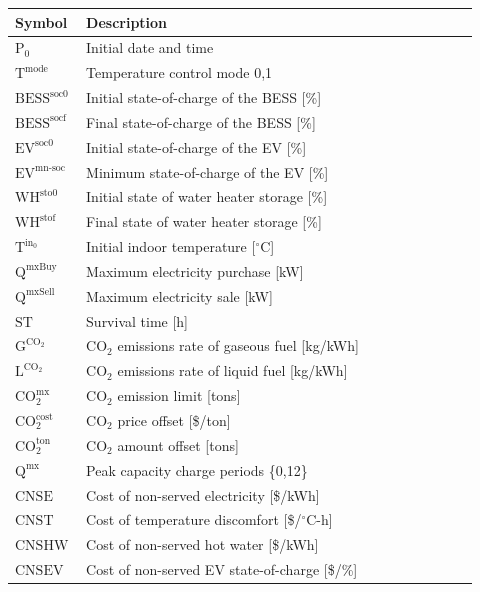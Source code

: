 \documentclass[11pt]{article}
\begin{document}
\begin{center}
\centering
\begin{tabular}{p{0.12\linewidth}p{0.8\linewidth}}
\hline
\textbf{Symbol} & \textbf{Description} \\
\hline
\(\text{P}_0\) & Initial date and time \\
\(\text{T}^\text{mode}\) & Temperature control mode {0,1} \\
\(\text{BESS}^{\text{soc0}}\) & Initial state-of-charge of the BESS [\%] \\
\(\text{BESS}^{\text{socf}}\) & Final state-of-charge of the BESS [\%] \\
\(\text{EV}^{\text{soc0}}\) & Initial state-of-charge of the EV [\%] \\
\(\text{EV}^{\text{mn-soc}}\) & Minimum state-of-charge of the EV [\%] \\
\(\text{WH}^{\text{sto0}}\) & Initial state of water heater storage [\%] \\
\(\text{WH}^{\text{stof}}\) & Final state of water heater storage [\%] \\
\(\text{T}^{\text{in}_0}\) & Initial indoor temperature [\(^\circ\text{C}\)] \\
\(\text{Q}^\text{mxBuy}\) & Maximum electricity purchase [kW] \\
\(\text{Q}^\text{mxSell}\) & Maximum electricity sale [kW] \\
\(\text{ST}\) & Survival time [h] \\
\(\text{G}^{\text{CO}_2}\) & CO\(_2\) emissions rate of gaseous fuel [kg/kWh] \\
\(\text{L}^{\text{CO}_2}\) & CO\(_2\) emissions rate of liquid fuel [kg/kWh] \\
\(\text{CO}_{2}^{\text{mx}}\) & CO\(_2\) emission limit [tons] \\
\(\text{CO}_{2}^{\text{cost}}\) & CO\(_2\) price offset [\$/ton] \\
\(\text{CO}_{2}^{\text{ton}}\) & CO\(_2\) amount offset [tons] \\
\(\text{Q}^\text{mx}\) & Peak capacity charge periods \{0,12\} \\
\(\text{CNSE}\) & Cost of non-served electricity [\$/kWh] \\
\(\text{CNST}\) & Cost of temperature discomfort [\$/\(^\circ\text{C}\)-h] \\
\(\text{CNSHW}\) & Cost of non-served hot water [\$/kWh] \\
\(\text{CNSEV}\) & Cost of non-served EV state-of-charge [\$/\%] \\

\end{tabular}
\end{center}
\end{document}
